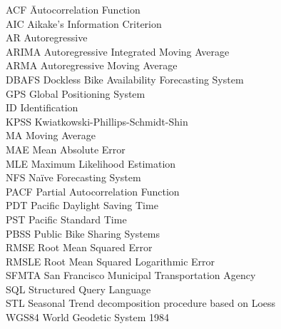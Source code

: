 \documentclass[12pt,oneside]{reedthesis}
\begin{document}
  \listoffigures
  \begin{dedication}
    \begin{tabbing}
    ACF \hspace{3em} \=  Autocorrelation Function \\
    AIC \>  Aikake’s Information Criterion \\
    AR \> Autoregressive \\
    ARIMA \> Autoregressive Integrated Moving Average \\
    ARMA \> Autoregressive Moving Average \\
    DBAFS \> Dockless Bike Availability Forecasting System \\
    GPS \>  Global Positioning System \\
    ID \> Identification \\
    KPSS \>  Kwiatkowski-Phillips-Schmidt-Shin \\
    MA \> Moving Average \\
    MAE \> Mean Absolute Error \\
    MLE \> Maximum Likelihood Estimation \\
    NFS \> Naïve Forecasting System \\
    PACF \> Partial Autocorrelation Function \\
    PDT \>  Pacific Daylight Saving Time \\
    PST \> Pacific Standard Time \\
    PBSS \> Public Bike Sharing Systems \\
    RMSE \> Root Mean Squared Error \\
    RMSLE \> Root Mean Squared Logarithmic Error \\
    SFMTA \>  San Francisco Municipal Transportation Agency \\
    SQL \>  Structured Query Language \\
    STL \>  Seasonal Trend decomposition procedure based on Loess \\
    WGS84 \> World Geodetic System 1984
    \end{tabbing}
  \end{dedication}
\end{document}
